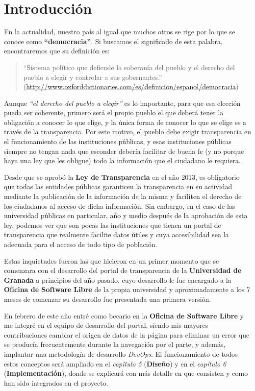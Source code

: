 \chapter{Introducción}

En la actualidad, nuestro país al igual que muchos otros se rige por lo que se conoce como \textbf{``democracia''}. Si buscamos
el significado de esta palabra, encontraremos que su definición es: 

\begin{quote}``Sistema político que defiende la soberanía del pueblo y el derecho del pueblo a elegir y controlar a sus gobernantes.''
\newline(\url{http://www.oxforddictionaries.com/es/definicion/espanol/democracia})
\end{quote}

Aunque \textit{``el derecho del pueblo a elegir''} es lo importante, para que esa elección pueda ser coherente, primero será el propio pueblo el que deberá tener la obligación a conocer lo que elige, y la única forma de conocer lo que se elige es a través de la transparencia. Por este motivo, el pueblo debe exigir transparencia en el funcionamiento de las instituciones públicas, y esas instituciones públicas siempre no tengan nada que esconder debería facilitar de buena fe (y no porque haya una ley que les obligue) todo la información que el ciudadano le requiera.

\bigskip
Desde que se aprobó la \textbf{Ley de Transparencia} en el año 2013, es obligatorio que todas las entidades públicas garanticen la transparencia en su actividad mediante la publicación de la información de la misma y faciliten el derecho de los ciudadanos al acceso de dicha información. Sin embargo, en el caso de las universidad públicas en particular, año y medio después de la aprobación de esta ley, podemos ver que son pocas las instituciones que tienen un portal de transparencia que realmente facilite datos útiles y cuya accesibilidad sea la adecuada para el acceso de todo tipo de población.

\bigskip
Estas inquietudes fueron las que hicieron en un primer momento que se comenzara con el desarrollo del portal de transparencia de la \textbf{Universidad de Granada} a principios del año pasado, cuyo desarrollo le fue encargado a la \textbf{Oficina de Software Libre} de la propia universidad y aproximadamente a los 7 meses de comenzar su desarrollo fue presentada una primera versión.

\bigskip
En febrero de este año entré como becario en la \textbf{Oficina de Software Libre} y me integré en el equipo de desarrollo del portal, siendo mis mayores contribuciones cambiar el origen de datos de la página para eliminar un error que se producía frecuentemente durante la navegación por el parte, y además, implantar una metodología de desarrollo \textit{DevOps}. El funcionamiento de todos estos conceptos será ampliado en el \textit{capítulo 5} (\textbf{Diseño}) y en el \textit{capítulo 6} (\textbf{Implementación}), donde se explicará con más detalle en que consisten y como han sido integrados en el proyecto.


